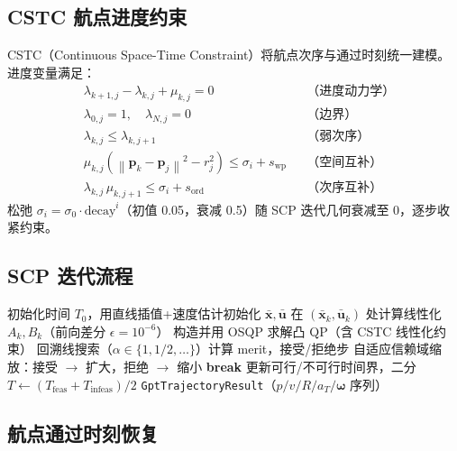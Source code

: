 \documentclass[UTF8, a4paper, 11pt]{ctexart}
\newcommand{\bx}{\mathbf{x}}
\newcommand{\bu}{\mathbf{u}}
\newcommand{\bp}{\mathbf{p}}
\newcommand{\bw}{\boldsymbol{\omega}}
\newcommand{\norm}[1]{\left\|#1\right\|}
\begin{document}
\subsection{CSTC 航点进度约束}

CSTC（Continuous Space-Time Constraint）将航点次序与通过时刻统一建模。进度变量满足：
\begin{align}
  &\lambda_{k+1,j} - \lambda_{k,j} + \mu_{k,j} = 0 &&\text{（进度动力学）}\tag{F7}\\
  &\lambda_{0,j} = 1,\quad \lambda_{N,j} = 0 &&\text{（边界）}\\
  &\lambda_{k,j} \leq \lambda_{k,j+1} &&\text{（弱次序）}\\
  &\mu_{k,j}\!\left(\norm{\bp_k - \bp_j}^2 - r_j^2\right) \leq \sigma_i + s_{\text{wp}} &&\text{（空间互补）}\tag{F8}\\
  &\lambda_{k,j}\,\mu_{k,j+1} \leq \sigma_i + s_{\text{ord}} &&\text{（次序互补）}\tag{F9}
\end{align}
松弛 $\sigma_i = \sigma_0 \cdot \text{decay}^i$（初值 0.05，衰减 0.5）随 SCP 迭代几何衰减至 0，逐步收紧约束。

\subsection{SCP 迭代流程}

\begin{algorithm}[H]
\caption{SCP 最短时间轨迹优化}
\begin{algorithmic}[1]
\State 初始化时间 $T_0$，用直线插值+速度估计初始化 $\bar{\bx}, \bar{\bu}$
    \State 在 $(\bar{\bx}_k, \bar{\bu}_k)$ 处计算线性化 $A_k, B_k$（前向差分 $\epsilon=10^{-6}$）
    \State 构造并用 OSQP 求解凸 QP（含 CSTC 线性化约束）
    \State 回溯线搜索（$\alpha\in\{1,1/2,\dots\}$）计算 merit，接受/拒绝步
    \State 自适应信赖域缩放：接受 $\to$ 扩大，拒绝 $\to$ 缩小
      \State \textbf{break}
    \EndIf
  \EndFor
  \State 更新可行/不可行时间界，二分 $T \leftarrow (T_{\text{feas}}+T_{\text{infeas}})/2$
\EndFor
\State \Return \texttt{GptTrajectoryResult}（$p/v/R/a_T/\bw$ 序列）
\end{algorithmic}
\end{algorithm}

\subsection{航点通过时刻恢复}
\end{document}
